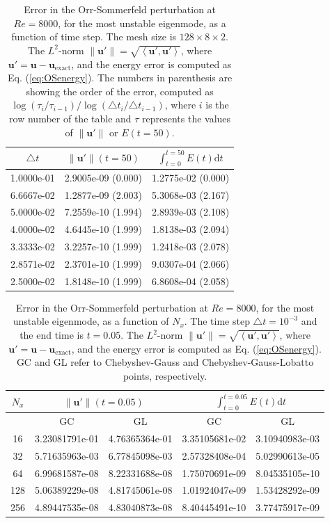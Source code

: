\documentclass[preprint]{elsarticle}
\begin{document}
\begin{table}
	\centering
	\caption{Error in the Orr-Sommerfeld perturbation at $Re=8000$, for the most unstable eigenmode, as a function of time step. The mesh size is $128 \times 8 \times 2$. The $L^2$-norm $ \| \bm{u}' \| = \sqrt{\left< \bm{u}', \bm{u}'\right>}$, where $\bm{u}'=\bm{u}-\bm{u}_{\mathrm{exact}}$, and the energy error is computed as Eq. (\ref{eq:OSenergy}). The numbers in parenthesis are showing the order of the error, computed as $\log(\tau_i/\tau_{i-1})/\log(\triangle t_i/ \triangle t_{i-1})$, where $i$ is the row number of the table and $\tau$ represents the values of $\|\bm{u}'\|$ or $E(t=50)$.  \label{tab:OS}}
	\begin{tabular}{ccc}	
 $\triangle t$ & $\| \bm{u}' \|(t=50)$ & $\int_{t=0}^{t=50}E(t) \mathrm{d}t$ \\
 \hline

1.0000e-01 & 2.9005e-09  (0.000) & 1.2775e-02 (0.000) \\
6.6667e-02 & 1.2877e-09  (2.003) & 5.3068e-03 (2.167) \\
5.0000e-02 & 7.2559e-10  (1.994) & 2.8939e-03 (2.108) \\
4.0000e-02 & 4.6445e-10  (1.999) & 1.8138e-03 (2.094) \\
3.3333e-02 & 3.2257e-10  (1.999) & 1.2418e-03 (2.078) \\
2.8571e-02 & 2.3701e-10  (1.999) & 9.0307e-04 (2.066) \\
2.5000e-02 & 1.8148e-10  (1.999) & 6.8608e-04 (2.058)
	\end{tabular}
\end{table}

\begin{table}
	\centering
	\caption{Error in the Orr-Sommerfeld perturbation at $Re=8000$, for the most unstable eigenmode, as a function of $N_x$. The time step $\triangle t = 10^{-3}$ and the end time is $t=0.05$. The $L^2$-norm $ \| \bm{u}' \| = \sqrt{\left< \bm{u}', \bm{u}'\right>}$, where $\bm{u}'=\bm{u}-\bm{u}_{\mathrm{exact}}$, and the energy error is computed as Eq. (\ref{eq:OSenergy}). GC and GL refer to Chebyshev-Gauss and Chebyshev-Gauss-Lobatto points, respectively.   \label{tab:OS_spatial}}
	\begin{tabular}{ccccc}	
		$N_x$ & \multicolumn{2}{c}{${\| \bm{u}' \|(t=0.05)}$} & \multicolumn{2}{c}{$\int_{t=0}^{t=0.05}E(t) \mathrm{d}t$} \\
		\hline
			 & GC & GL & GC & GL \\
		\hline
16	&	3.23081791e-01	&	4.76365364e-01	&	3.35105681e-02	&	3.10940983e-03	\\
32	&	5.71635963e-03	&	6.77845098e-03	&	2.57328408e-04	&	5.02990613e-05	\\
64	&	6.99681587e-08	&	8.22331688e-08	&	1.75070691e-09	&	8.04535105e-10	\\
128	&	5.06389229e-08	&	4.81745061e-08	&	1.01924047e-09	&	1.53428292e-09	\\
256	&	4.89447535e-08	&	4.83040873e-08	&	8.40445491e-10	&	3.77475917e-09	
	\end{tabular}
\end{table}
\end{document}
